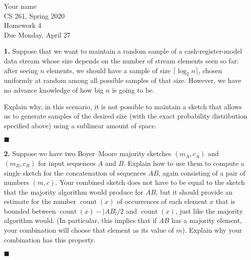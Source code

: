 \documentclass{article}
\newenvironment{problem}{%
  \bigskip\noindent\begin{boxedminipage}{\columnwidth}%
}{\end{boxedminipage}}
\newenvironment{solution}{%
  \begin{trivlist}\item[]%
}{%
  \mbox{}\penalty10000\hfill\ensuremath{\scriptscriptstyle\blacksquare}%
  \end{trivlist}%
}
\begin{document}
\begin{flushright}
Your name\\
CS 261, Spring 2020\\
Homework 4\\
Due Monday, April 27
\end{flushright}

\begin{problem}
\textbf{1.} Suppose that we want to maintain a random sample of a cash-register-model data stream whose size depends on the number of stream elements seen so far: after seeing $n$ elements, we should have a sample of size $\lceil\log_2 n\rceil$, chosen uniformly at random among all possible samples of that size. However, we have no advance knowledge of how big $n$ is going to be.

\smallskip
Explain why, in this scenario, it is not possible to maintain a sketch that allows us to generate samples of the desired size (with the exact probability distribution specified above) using a sublinear amount of space.
\end{problem}

\begin{solution}
\end{solution}

\begin{problem}
\textbf{2.} Suppose we have two Boyer--Moore majority sketches $(m_A,c_A)$ and $(m_B,c_B)$ for input sequences $A$ and $B$. Explain how to use them to compute a single sketch for the concatenation of sequences $AB$, again consisting of a pair of numbers $(m,c)$. Your combined sketch does not have to be equal to the sketch that the majority algorithm would produce for $AB$, but it should provide an estimate for the number $\operatorname{count}(x)$ of occurrences of each element $x$ that is bounded between $\operatorname{count}(x)-|AB|/2$ and  $\operatorname{count}(x)$, just like the majority algorithm would. (In particular, this implies that if $AB$ has a majority element, your combination will choose that element as its value of $m$). Explain why your combination has this property.
\end{problem}

\begin{solution}
\end{solution}
\end{document}
